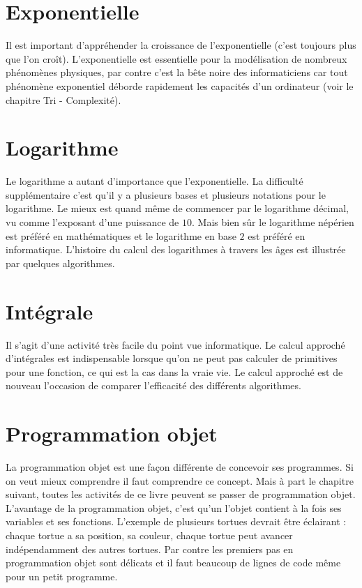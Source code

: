 \documentclass[11pt,class=report,crop=false]{standalone}
\begin{document}
\section{Exponentielle}

Il est important d'appréhender la croissance de l'exponentielle 
(c'est toujours plus que l'on \og{}croît\fg{}). L'exponentielle est essentielle pour la modélisation de
nombreux phénomènes physiques, par contre c'est la bête noire des informaticiens car tout phénomène exponentiel déborde rapidement les capacités d'un ordinateur (voir le chapitre \og{}Tri - Complexité\fg{}).


\section{Logarithme}

Le logarithme a autant d'importance que l'exponentielle. La difficulté supplémentaire c'est qu'il y a plusieurs bases et plusieurs notations pour le logarithme. Le mieux est quand même de commencer par le logarithme décimal, vu comme l'exposant d'une puissance de $10$. Mais bien sûr le logarithme népérien est préféré en mathématiques et le logarithme en base $2$ est préféré en informatique.
L'histoire du calcul des logarithmes à travers les âges est illustrée par quelques algorithmes.


\section{Intégrale}

Il s'agit d'une activité très facile du point vue informatique.
Le calcul approché d'intégrales est indispensable lorsque qu'on ne peut pas calculer de primitives pour une fonction, ce qui est la cas dans la \og{}vraie vie\fg{}.
Le calcul approché est de nouveau l'occasion de comparer l'efficacité des différents algorithmes. 


\section{Programmation objet}

La programmation objet est une façon différente de concevoir ses programmes. 
Si on veut mieux comprendre \Python{} il faut comprendre ce concept. 
Mais à part le chapitre suivant, toutes les activités de ce livre peuvent se passer de programmation objet.  
L'avantage de la programmation objet, c'est qu'un l'objet contient à la fois ses variables et ses fonctions. L'exemple de plusieurs tortues devrait être éclairant : chaque tortue a sa position, sa couleur, chaque tortue peut avancer indépendamment des autres tortues. 
Par contre les premiers pas en programmation objet sont délicats et il faut beaucoup de lignes de code même pour un petit programme.
\end{document}
